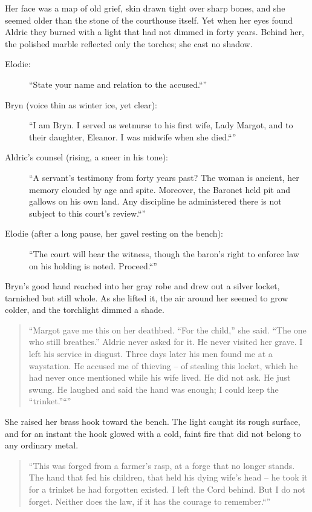 \documentclass[11pt,twoside]{book}
\begin{document}
Her face was a map of old grief, skin drawn tight over sharp bones, and she seemed older than the stone of the courthouse itself. Yet when her eyes found Aldric they burned with a light that had not dimmed in forty years. Behind her, the polished marble reflected only the torches; she cast no shadow.

\begin{description}
\item[Elodie:] ``State your name and relation to the accused.``''

\item[Bryn (voice thin as winter ice, yet clear):] ``I am Bryn. I served as wetnurse to his first wife, Lady Margot, and to their daughter, Eleanor. I was midwife when she died.``''

\item[Aldric's counsel (rising, a sneer in his tone):] ``A servant's testimony from forty years past? The woman is ancient, her memory clouded by age and spite. Moreover, the Baronet held pit and gallows on his own land. Any discipline he administered there is not subject to this court's review.``''

\item[Elodie (after a long pause, her gavel resting on the bench):] ``The court will hear the witness, though the baron's right to enforce law on his holding is noted. Proceed.``''
\end{description}

Bryn's good hand reached into her gray robe and drew out a silver locket, tarnished but still whole. As she lifted it, the air around her seemed to grow colder, and the torchlight dimmed a shade.

\begin{quote}
``Margot gave me this on her deathbed. ``For the child,'' she said. ``The one who still breathes.'' Aldric never asked for it. He never visited her grave. I left his service in disgust. Three days later his men found me at a waystation. He accused me of thieving -- of stealing this locket, which he had never once mentioned while his wife lived. He did not ask. He just swung. He laughed and said the hand was enough; I could keep the ``trinket.''``''
\end{quote}

She raised her brass hook toward the bench. The light caught its rough surface, and for an instant the hook glowed with a cold, faint fire that did not belong to any ordinary metal.

\begin{quote}
``This was forged from a farmer's rasp, at a forge that no longer stands. The hand that fed his children, that held his dying wife's head -- he took it for a trinket he had forgotten existed. I left the Cord behind. But I do not forget. Neither does the law, if it has the courage to remember.``''
\end{quote}
\end{document}
